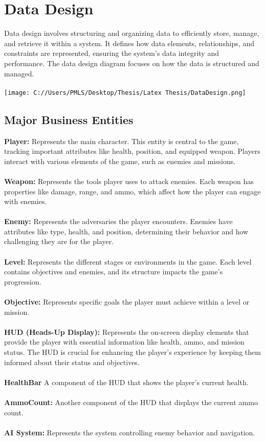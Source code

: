 \section{Data Design}
Data design involves structuring and organizing data to efficiently store, manage, and retrieve it within a system. It defines how data elements, relationships, and constraints are represented, ensuring the system's data integrity and performance.
The data design diagram focuses on how the data is structured and managed.
\\
\\
\texttt{[image: C://Users/PMLS/Desktop/Thesis/Latex Thesis/DataDesign.png]}
\subsection{Major Business Entities}

\textbf{Player:}
Represents the main character. This entity is central to the game, tracking important attributes like health, position, and equipped weapon. Players interact with various elements of the game, such as enemies and missions.
\\
\\
\textbf{Weapon:}
Represents the tools player uses to attack enemies. Each weapon has properties like damage, range, and ammo, which affect how the player can engage with enemies.
\\
\\
\textbf{Enemy:}
Represents the adversaries the player encounters. Enemies have attributes like type, health, and position, determining their behavior and how challenging they are for the player.
\\
\\
\textbf{Level:}
Represents the different stages or environments in the game. Each level contains objectives and enemies, and its structure impacts the game's progression.
\\
\\
\textbf{Objective:}
Represents specific goals the player must achieve within a level or mission.
\\
\\
\textbf{HUD (Heads-Up Display):}
Represents the on-screen display elements that provide the player with essential information like health, ammo, and mission status. The HUD is crucial for enhancing the player's experience by keeping them informed about their status and objectives.
\\
\\
\textbf{HealthBar}
A component of the HUD that shows the player's current health.
\\
\\
\textbf{AmmoCount:}
Another component of the HUD that displays the current ammo count.
\\
\\
\textbf{AI System:}
Represents the system controlling enemy behavior and navigation.

